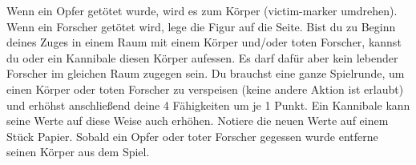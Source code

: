   \begin{itemize}
    \bitem Wenn ein Opfer getötet wurde, wird es zum Körper (victim-marker umdrehen). Wenn ein Forscher getötet wird, lege die Figur auf die Seite. Bist du zu Beginn deines Zuges in einem Raum mit einem Körper und/oder toten Forscher, kannst du oder ein Kannibale diesen Körper aufessen. Es darf dafür aber kein lebender Forscher im gleichen Raum zugegen sein.
    \bitem Du brauchst eine ganze Spielrunde, um einen Körper oder toten Forscher zu verspeisen (keine andere Aktion ist erlaubt) und erhöhst anschließend deine 4 Fähigkeiten um je 1 Punkt. Ein Kannibale kann seine Werte auf diese Weise auch erhöhen. Notiere die neuen Werte auf einem Stück Papier.
    \bitem Sobald ein Opfer oder toter Forscher gegessen wurde entferne seinen Körper aus dem Spiel.
    \end{itemize}

